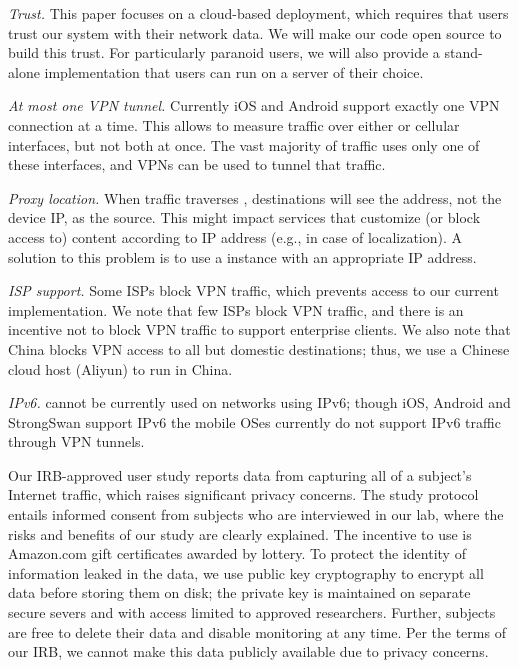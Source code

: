 \noindent\emph{Trust.} This paper focuses on a cloud-based \meddle deployment, which requires 
that users trust our system with their network data. We will make our code open source to build this 
trust. For particularly paranoid users, we will also provide a stand-alone implementation that users 
can run on a server of their choice.

\noindent\emph{At most one VPN tunnel.}
Currently iOS and Android support exactly one VPN connection at a time. 
This allows \meddle to measure traffic over either \wifi or cellular interfaces, but not both at once.
The vast majority of traffic uses only one of these interfaces, and VPNs can be used to tunnel that traffic.

\noindent\emph{Proxy location.} 
When traffic traverses \meddle, destinations will see the \meddle address, not the device IP, as the source. 
This might impact services  that customize (or block access to) content according to IP address (e.g., in case of localization). 
A solution to this problem is to use a \meddle{} instance with an appropriate IP address.

\noindent\emph{ISP support.}
Some ISPs block VPN traffic, which prevents access to our current \meddle implementation. 
We note that few ISPs block VPN traffic, and there is an incentive not to block VPN traffic to 
support enterprise clients. We also note that China blocks VPN access to all but domestic 
destinations; thus, we use a Chinese cloud host (Aliyun) to run  \meddle in China.

\noindent\emph{IPv6.}
\meddle{} cannot be currently used on networks using IPv6; though iOS, Android and StrongSwan support IPv6 
the mobile OSes currently do not support IPv6 traffic through VPN tunnels.


 Our IRB-approved user study reports data from capturing all of a 
subject's Internet traffic, which raises significant privacy concerns.  
The study protocol entails informed consent
from subjects who are interviewed in our lab, where the risks and
benefits of our study are clearly explained.  The incentive to use
\meddle is Amazon.com gift certificates awarded by lottery. To protect the
identity of information leaked in the data, we use public key
cryptography to encrypt all data before storing them 
on disk; the private key is
maintained on separate secure severs and with access limited to
approved researchers.  Further, subjects are free to delete their
data and disable monitoring at any time.  Per the terms of our IRB, we cannot 
make this data publicly available due to privacy concerns. 


